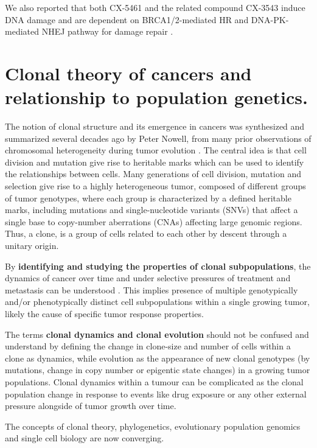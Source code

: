 We also reported that both CX-5461 and the related compound CX-3543 induce DNA damage and are dependent on BRCA1/2-mediated HR and DNA-PK-mediated NHEJ pathway for damage repair \cite{xu2017cx}.


\section{Clonal theory of cancers and relationship to population genetics.}
The notion of clonal structure and its emergence in cancers was synthesized and summarized several decades ago by Peter Nowell, from many prior observations of chromosomal heterogeneity during tumor evolution \cite{nowell1976clonal}. The central idea is that cell division and mutation give rise to heritable marks which can be used to identify the relationships between cells. Many generations of cell division, mutation and selection give rise to a highly heterogeneous tumor, composed of different groups of tumor genotypes, where each group is characterized by a defined heritable marks, including mutations and single-nucleotide variants (SNVs) that affect a single base to copy-number aberrations (CNAs) affecting large genomic regions. Thus, a clone, is a group of cells related to each other by descent through a unitary origin. 

By \textbf{identifying and studying the properties of clonal subpopulations}, the dynamics of cancer over time and under selective pressures of treatment and metastasis can be understood \cite{aparicio2013implications}. This implies presence of multiple genotypically and/or phenotypically distinct cell subpopulations within a single growing tumor, likely the cause of specific tumor response properties.

The terms \textbf{clonal dynamics and clonal evolution} should not be confused and understand by defining the change in clone-size and number of cells within a clone as dynamics, while evolution as the appearance of new clonal genotypes (by mutations, change in copy number or epigentic state changes) in a growing tumor populations. 
Clonal dynamics within a tumour can be complicated as the clonal population change in response to events like drug exposure or any other external pressure alongside of tumor growth over time.

The concepts of clonal theory, phylogenetics, evolutionary population genomics and single cell biology are now converging.


